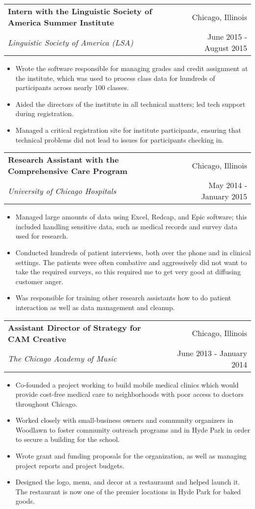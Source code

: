 \documentclass[letterpaper,10pt]{article}
\makeatletter
\newcommand{\resitem}[1]{
    \item #1 \vspace{-2pt}
}
\newcommand{\ressubheading}[4]{
    \begin{tabular*}{7in}{
        l@{\cftdotfill{\cftsecdotsep}\extracolsep{\fill}}r}
		    \textbf{#1} & #2 \\
		    \textit{#3} & #4 \\
    \end{tabular*}
    \vspace{-6pt}}
\makeatother
\begin{document}
\ressubheading{Intern with the Linguistic Society of America Summer Institute}{Chicago, Illinois}{Linguistic Society of America (LSA)}{June 2015 - August 2015}
\begin{itemize}
	\resitem{Wrote the software responsible for managing grades and credit assignment at the institute, which was used to process class data for hundreds of participants across nearly 100 classes.} 
	\resitem{Aided the directors of the institute in all technical matters; led tech support during registration.}
	\resitem{Managed a critical registration site for institute participants, ensuring that technical problems did not lead to issues for participants checking in.}
\end{itemize}

\ressubheading{Research Assistant with the Comprehensive Care Program}{Chicago, Illinois}{University of Chicago Hospitals}{May 2014 - January 2015}
\begin{itemize}
	\resitem{Managed large amounts of data using Excel, Redcap, and Epic software; this included handling sensitive data, such as medical records and survey data used for research.}
	\resitem{Conducted hundreds of patient interviews, both over the phone and in clinical settings. The patients were often combative and aggressively did not want to take the required surveys, so this required me to get very good at diffusing customer anger.}
	\resitem{Was responsible for training other research assistants how to do patient interaction as well as data management and cleanup.}
\end{itemize}

\ressubheading{Assistant Director of Strategy for CAM Creative}{Chicago, Illinois}{The Chicago Academy of Music}{June 2013 - January 2014}
\begin{itemize}
	\resitem{Co-founded a project working to build mobile medical clinics which would provide cost-free medical care to neighborhoods with poor access to doctors throughout Chicago.}
	\resitem{Worked closely with small-business owners and community organizers in Woodlawn to foster community outreach programs and in Hyde Park in order to secure a building for the school.}
	\resitem{Wrote grant and funding proposals for the organization, as well as managing project reports and project budgets.}
	\resitem{Designed the logo, menu, and decor at a restauraunt and helped launch it. The restaurant is now one of the premier locations in Hyde Park for baked goods.}
\end{itemize}
\end{document}

